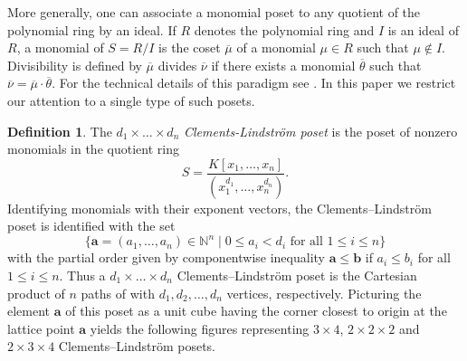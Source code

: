 \documentclass[11pt, reqno]{amsart}
\newcommand{\N}{{\mathbb N}}
\newcommand{\ba}{{\mathbf a}}
\newcommand{\bb}{{\mathbf b}}
\theoremstyle{plain} %
\theoremstyle{definition}
\newtheorem{defn}[thm]{Definition}
\theoremstyle{remark}
\numberwithin{equation}{section}  %
\begin{document}
 More generally, one can associate a monomial poset to any quotient of the polynomial ring by an ideal. If $R$ denotes the polynomial ring and $I$ is an ideal of $R$, a monomial of $S=R/I$ is the coset $\overline{\mu}$  of a monomial  $\mu\in R$ such that  $\mu\not\in I$. Divisibility is defined by $\overline{\mu}$ divides $\overline{\nu}$ if there exists a monomial $\overline{\theta}$ such that $\overline{\nu}=\overline{\mu}\cdot \overline{\theta}$. For the technical details of this paradigm see \cite{Kuz}. In this paper we restrict our attention to a single type of such posets.
 
 
\begin{defn}\label{ex: box poset}
The $d_1\times  \ldots \times  d_n$ {\em Clements-Lindstr\"om poset} is the poset of nonzero monomials in the quotient ring 
\[
S=\frac{K[x_1,\ldots, x_n]}{(x_1^{d_1}, \ldots, x_n^{d_n})}.
\]
Identifying monomials with their exponent vectors, the Clements--Lindstr\"om poset is identified with the set
\[
\{\ba=(a_1,\ldots, a_n) \in \N^n \mid 0\leq a_i<d_i \text{ for all } 1\leq i\leq n\}
\]
with the partial order given by componentwise inequality $\ba\leq \bb $ if $a_i\leq b_i$  for all  $1\leq i\leq n$. 
Thus a $d_1\times  \ldots \times  d_n$ Clements--Lindstr\"om poset is the Cartesian product of $n$ paths of with $d_1, d_2, \ldots, d_n$ vertices, respectively. 
Picturing the element $\ba$ of this poset as a unit cube having the corner closest to origin at the lattice point $\ba$ yields the following figures representing  $3\times 4$,  $2\times 2\times 2$ and  $2\times 3\times 4$ Clements--Lindstr\"om posets.
\smallskip

\begin{figure}[htbp]
    \centering
    

\end{figure}
\end{defn}
\end{document}
